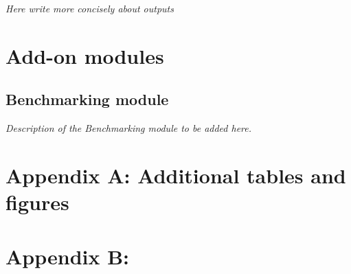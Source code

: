 \emph{Here write more concisely about outputs}


\section{Add-on modules}
\label{sec:addon-modules}

\subsection{Benchmarking module}

\emph{Description of the Benchmarking module to be added here.}


\newpage
\singlespacing
\baselineskip=10pt





\newpage


\begin{subappendices}
	\setcounter{figure}{0}
	\renewcommand{\thefigure}{A\arabic{figure}}
	\setcounter{table}{0}
	\renewcommand{\thetable}{A\arabic{table}}
	\section*{Appendix A: Additional tables and figures}


    	\section*{Appendix B: }

\end{subappendices}

